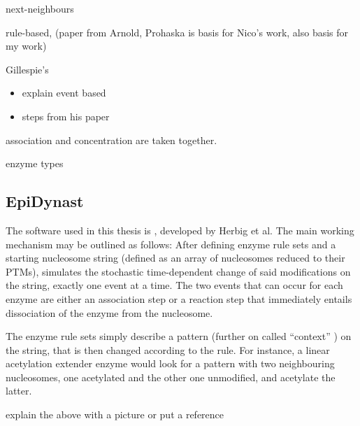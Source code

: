             \begin{itemize}
                {
                    \color{red}
                    \item next-neighbours
                    \item rule-based, (paper from Arnold, Prohaska is basis for Nico's work, also basis for my work)
                    \item Gillespie's
                        \begin{itemize}
                            \item explain event based
                            \item steps from his paper
                        \end{itemize}
                    \item association and concentration are taken together.
                    \item enzyme types

                }
            \end{itemize}
        \subsection{EpiDynast}
        \label{subsec:EpiDynast}
            The software used in this thesis is \ed, developed by Herbig et al. %
            The main working mechanism may be outlined as follows: After defining enzyme rule sets and a starting nucleosome string (defined as an array of nucleosomes reduced to their PTMs), \ed simulates the stochastic time-dependent change of said modifications on the string, exactly one event at a time. The two events that can occur for each enzyme are either an association step or a reaction step that immediately entails dissociation of the enzyme from the nucleosome.

            The enzyme rule sets simply describe a pattern (further on called “context” %
            ) on the string, that is then changed according to the rule. For instance, a linear acetylation extender enzyme %
            would look for a pattern with two neighbouring nucleosomes, one acetylated and the other one unmodified, and acetylate the latter.\\

            \begin{itemize}
                {
                    \color{red}
                    \item explain the above with a picture or put a reference
                }
            \end{itemize}

